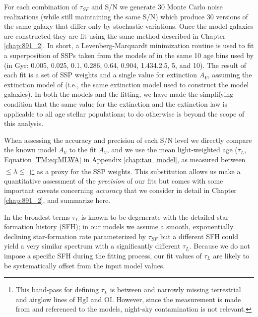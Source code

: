 
For each combination of $\tau_{SF}$ and S/N we generate 30 Monte Carlo
noise realizations (while still maintaining the same S/N) which
produce 30 versions of the same galaxy that differ only by stochastic
variations. Once the model galaxies are constructed they are fit using
the same method described in Chapter \ref{chap:891_2}. In short, a
Levenberg-Marquardt minimization routine is used to fit a
superposition of SSPs taken from the models of \citet{Bruzual03} in
the same 10 age bins used by \citet{Tremonti04} (in Gyr: 0.005, 0.025,
0.1, 0.286, 0.64, 0.904, 1.434.2.5, 5, and 10). The result of each fit
is a set of SSP weights and a single value for extinction $A_V$,
assuming the extinction model of \citet{Charlot00} (i.e., the same
extinction model used to construct the model galaxies). In both the
models and the fitting, we have made the simplifying condition that
the same value for the extinction and the extinction law is applicable
to all age stellar populations; to do otherwise is beyond the scope of
this analysis.

When assessing the accuracy and precision of each S/N level we
directly compare the known model $A_V$ to the fit $A_V$, and we use
the mean light-weighted age ($\tau_L$, Equation \ref{TM:eq:MLWA} in
Appendix \ref{chap:tau_model}, as measured between 
$\leq\lambda\leq$ )\footnote{ This band-pass for
  defining $\tau_L$ is between and narrowly missing terrestrial and
  airglow lines of HgI and OI. However, since the measurement is made
  from and referenced to the models, night-sky contamination is not
  relevant.}  as a proxy for the SSP weights. This substitution allows
us make a quantitative assessment of the {\it precision} of our fits
but comes with some important caveats concerning {\it accuracy} that
we consider in detail in Chapter \ref{chap:891_2}, and summarize here.

In the broadest terms $\tau_L$ is known to be degenerate with the
detailed star formation history (SFH); in our models we assume a
smooth, exponentially declining star-formation rate parameterized by
$\tau_{SF}$ but a different SFH could yield a very similar spectrum
with a significantly different $\tau_L$.  Because we do not impose a
specific SFH during the fitting process, our fit values of $\tau_L$
are likely to be systematically offset from the input model values.

